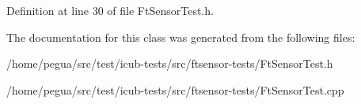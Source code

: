 Definition at line 30 of file Ft\-Sensor\-Test.\-h.



The documentation for this class was generated from the following files\-:\begin{DoxyCompactItemize}
\item 
/home/pegua/src/test/icub-\/tests/src/ftsensor-\/tests/Ft\-Sensor\-Test.\-h\item 
/home/pegua/src/test/icub-\/tests/src/ftsensor-\/tests/Ft\-Sensor\-Test.\-cpp\end{DoxyCompactItemize}
